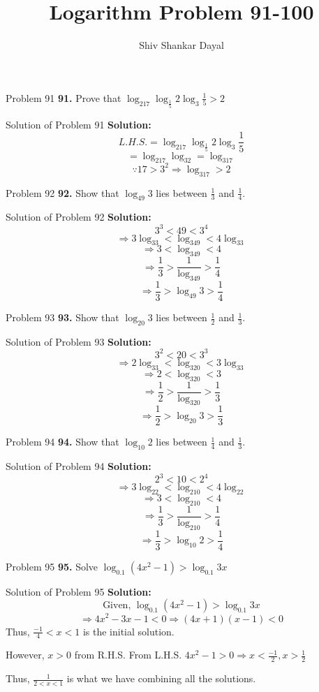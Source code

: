 \documentclass[aspectratio=169,8pt]{beamer}
\title{Logarithm Problem 91-100}
\author[Shiv Shankar Dayal]{Shiv Shankar Dayal}
\begin{document}
\begin{frame}
  \titlepage
\end{frame}
\begin{frame}{Problem 91}
  \textbf{91.} Prove that $\log_217\log_{\frac{1}{5}}2\log_3\frac{1}{5} > 2$
\end{frame}
\begin{frame}{Solution of Problem 91}
  \textbf{Solution:} $$L.H.S. = \log_217\log_{\frac{1}{5}}2\log_3\frac{1}{5}$$
  $$= \log_217\log_32 = \log_317$$
  $$\because 17 > 3^2 \Rightarrow \log_317 > 2$$
\end{frame}
\begin{frame}{Problem 92}
  \textbf{92.} Show that $\log_{49}3$ lies between $\frac{1}{3}$ and $\frac{1}{4}.$
\end{frame}
\begin{frame}{Solution of Problem 92}
  \textbf{Solution:} $$3^3 < 49 < 3^4$$
  $$\Rightarrow 3\log_33 < \log_349 < 4\log_33$$
  $$\Rightarrow 3 < \log_349 < 4$$
  $$\Rightarrow \frac{1}{3} > \frac{1}{\log_349} > \frac{1}{4}$$
  $$\Rightarrow \frac{1}{3} > \log_{49}3 > \frac{1}{4}$$
\end{frame}
\begin{frame}{Problem 93}
  \textbf{93.} Show that $\log_{20}3$ lies between $\frac{1}{2}$ and $\frac{1}{3}.$
\end{frame}
\begin{frame}{Solution of Problem 93}
  \textbf{Solution:} $$3^2 < 20 < 3^3$$
  $$\Rightarrow 2\log_33 < \log_320 < 3\log_33$$
  $$\Rightarrow 2 < \log_320 < 3$$
  $$\Rightarrow \frac{1}{2} > \frac{1}{\log_320} > \frac{1}{3}$$
  $$\Rightarrow \frac{1}{2} > \log_{20}3 > \frac{1}{3}$$
\end{frame}
\begin{frame}{Problem 94}
  \textbf{94.} Show that $\log_{10}2$ lies between $\frac{1}{4}$ and $\frac{1}{3}.$
\end{frame}
\begin{frame}{Solution of Problem 94}
  \textbf{Solution:} $$2^3 < 10 < 2^4$$
  $$\Rightarrow 3\log_22 < \log_210 < 4\log_22$$
  $$\Rightarrow 3 < \log_210 < 4$$
  $$\Rightarrow \frac{1}{3} > \frac{1}{\log_210} > \frac{1}{4}$$
  $$\Rightarrow \frac{1}{3} > \log_{10}2 > \frac{1}{4}$$
\end{frame}
\begin{frame}{Problem 95}
  \textbf{95.} Solve $\log_{0.1}(4x^2 -1) > \log_{0.1}3x$
\end{frame}
\begin{frame}{Solution of Problem 95}
  \textbf{Solution:} $$\text{Given,~}\log_{0.1}(4x^2 -1) > \log_{0.1}3x$$
  $$\Rightarrow 4x^2 - 3x - 1 < 0 \Rightarrow (4x + 1)(x - 1) < 0$$
  Thus, $\frac{-1}{4}< x < 1$ is the initial solution.

  However, $x > 0$ from R.H.S. From L.H.S. $4x^2 - 1 > 0 \Rightarrow x < \frac{-1}{2}, x > \frac{1}{2}$

  Thus, $\frac{1}{2 < x < 1}$ is what we have combining all the solutions.
\end{frame}
\end{document}
